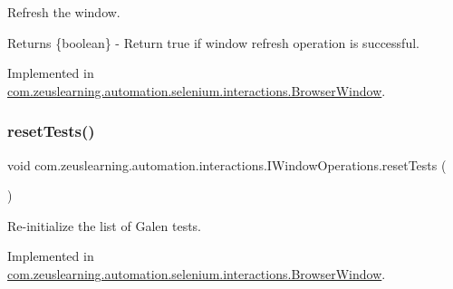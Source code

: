 Refresh the window.

\begin{DoxyReturn}{Returns}
\{boolean\} -\/ Return {\ttfamily true} if window refresh operation is successful. 
\end{DoxyReturn}


Implemented in \hyperlink{classcom_1_1zeuslearning_1_1automation_1_1selenium_1_1interactions_1_1BrowserWindow_ae774d056dd47837cc8b4c62e5fa8826a}{com.\+zeuslearning.\+automation.\+selenium.\+interactions.\+Browser\+Window}.

\hypertarget{interfacecom_1_1zeuslearning_1_1automation_1_1interactions_1_1IWindowOperations_adcf63fd0973053422e1cfdb7221e6a13}{}\label{interfacecom_1_1zeuslearning_1_1automation_1_1interactions_1_1IWindowOperations_adcf63fd0973053422e1cfdb7221e6a13} 
\subsubsection{\texorpdfstring{reset\+Tests()}{resetTests()}}
{\footnotesize\ttfamily void com.\+zeuslearning.\+automation.\+interactions.\+I\+Window\+Operations.\+reset\+Tests (\begin{DoxyParamCaption}{ }\end{DoxyParamCaption})}

Re-\/initialize the list of Galen tests. 

Implemented in \hyperlink{classcom_1_1zeuslearning_1_1automation_1_1selenium_1_1interactions_1_1BrowserWindow_aeed389e302169c0d1e6aae40e395fa68}{com.\+zeuslearning.\+automation.\+selenium.\+interactions.\+Browser\+Window}.

\hypertarget{interfacecom_1_1zeuslearning_1_1automation_1_1interactions_1_1IWindowOperations_ad3cb79f49fa700778fe85eb272c8385f}{}\label{interfacecom_1_1zeuslearning_1_1automation_1_1interactions_1_1IWindowOperations_ad3cb79f49fa700778fe85eb272c8385f} 
